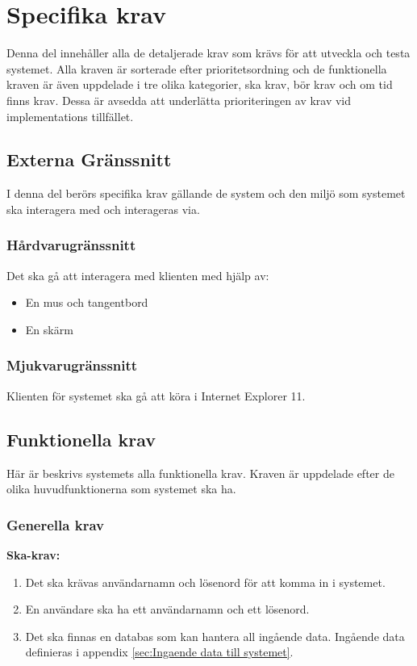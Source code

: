 \documentclass{article}
\begin{document}

\section{Specifika krav}
\label{sec:Specifika krav}
Denna del innehåller alla de detaljerade krav som krävs för att utveckla och
testa systemet. Alla kraven är sorterade efter prioritetsordning och de
funktionella kraven är även
uppdelade i tre olika kategorier, ska krav, bör krav och om tid finns krav.
Dessa är avsedda att underlätta prioriteringen av krav vid implementations
tillfället.

\subsection{Externa Gränssnitt}
\label{subsec:Externa Granssnitt}
I denna del berörs specifika krav gällande de system och den miljö som systemet
ska interagera med och interageras via.

\subsubsection{Hårdvarugränssnitt}
\label{subsec:EG-Hardvarugranssnitt}
Det ska gå att interagera med klienten med hjälp av:
\begin{itemize}
  \item En mus och tangentbord
  \item En skärm
\end{itemize}
\subsubsection{Mjukvarugränssnitt}

\label{subsec:EG-Mjukvarugranssnitt}
Klienten för systemet ska gå att köra i Internet Explorer 11.

\subsection{Funktionella krav}
Här är beskrivs systemets alla funktionella krav. Kraven är uppdelade efter de
olika huvudfunktionerna som systemet ska ha.
\label{subsec:Funktionella krav}
\subsubsection{Generella krav}
\label{subsec:Generella krav}
\textbf{Ska-krav: }
\begin{enumerate}
    \item Det ska krävas användarnamn och lösenord för att komma in i systemet.
    \item En användare ska ha ett användarnamn och ett lösenord.
    \item Det ska finnas en databas som kan hantera all ingående data.
    Ingående data definieras i appendix \ref{sec:Ingaende data till systemet}.
\end{enumerate}
\end{document}
